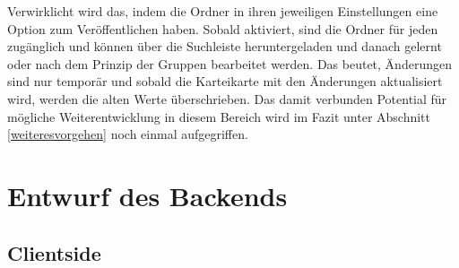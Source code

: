 Verwirklicht wird das, indem die Ordner in ihren jeweiligen Einstellungen eine Option zum Veröffentlichen haben. Sobald aktiviert, sind die Ordner für jeden zugänglich und können über die Suchleiste heruntergeladen und danach gelernt oder nach dem Prinzip der Gruppen bearbeitet werden. Das beutet, Änderungen sind nur temporär und sobald die Karteikarte mit den Änderungen aktualisiert wird, werden die alten Werte überschrieben. Das damit verbunden Potential für mögliche Weiterentwicklung in diesem Bereich wird im Fazit unter Abschnitt \ref{weiteresvorgehen} noch einmal aufgegriffen.


\section{Entwurf des Backends}
\label{section:entwurf_backend}

\subsection{Clientside}

